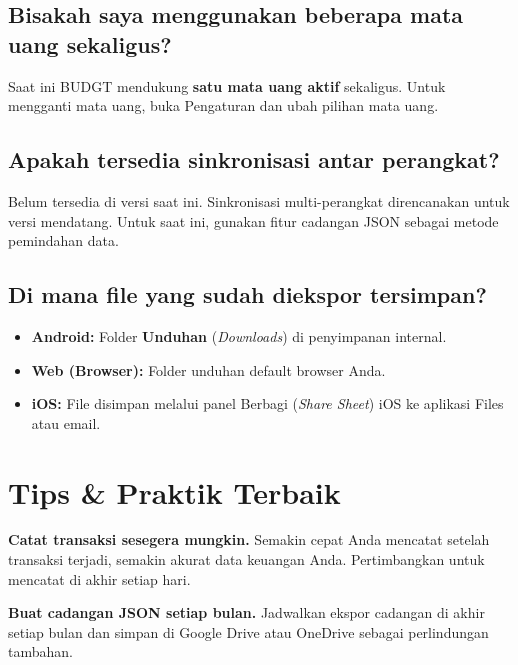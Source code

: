 \documentclass[12pt, a4paper]{article}
\begin{document}
\subsection*{Bisakah saya menggunakan beberapa mata uang sekaligus?}
Saat ini BUDGT mendukung \textbf{satu mata uang aktif} sekaligus. Untuk mengganti mata uang, buka Pengaturan dan ubah pilihan mata uang.

\subsection*{Apakah tersedia sinkronisasi antar perangkat?}
Belum tersedia di versi saat ini. Sinkronisasi multi-perangkat direncanakan untuk versi mendatang. Untuk saat ini, gunakan fitur cadangan JSON sebagai metode pemindahan data.

\subsection*{Di mana file yang sudah diekspor tersimpan?}
\begin{itemize}[leftmargin=1.5em]
  \item \textbf{Android:} Folder \textbf{Unduhan} (\textit{Downloads}) di penyimpanan internal.
  \item \textbf{Web (Browser):} Folder unduhan default browser Anda.
  \item \textbf{iOS:} File disimpan melalui panel Berbagi (\textit{Share Sheet}) iOS ke aplikasi Files atau email.
\end{itemize}

\section{Tips \& Praktik Terbaik}

\begin{tipbox}
\textbf{Catat transaksi sesegera mungkin.} Semakin cepat Anda mencatat setelah transaksi terjadi, semakin akurat data keuangan Anda. Pertimbangkan untuk mencatat di akhir setiap hari.
\end{tipbox}

\begin{tipbox}
\textbf{Buat cadangan JSON setiap bulan.} Jadwalkan ekspor cadangan di akhir setiap bulan dan simpan di Google Drive atau OneDrive sebagai perlindungan tambahan.
\end{tipbox}
\end{document}
